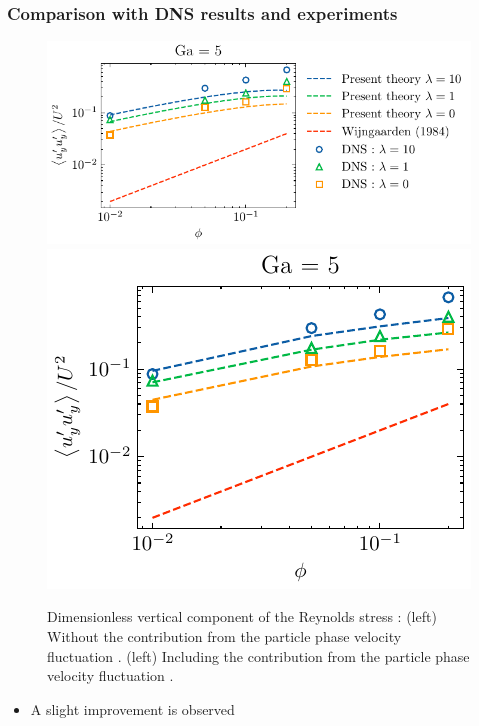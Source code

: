 \documentclass{sintefbeamer}
\begin{document}
\begin{frame}
  \frametitle{Comparison with DNS results and experiments}
  \begin{figure}[h!]
    \centering    
    \includegraphics[height = 0.25\textwidth]{image/HOMOGENEOUS_NEW/CA/UUyy.pdf}
    \includegraphics[height = 0.25\textwidth]{image/HOMOGENEOUS_NEW/CA/UUyykp.pdf}
    \caption{
       Dimensionless vertical component of the Reynolds stress :
       (left) Without the contribution from the particle phase velocity fluctuation . 
       (left) Including the contribution from the particle phase velocity fluctuation . 
    }
    \label{fig:Cp}
\end{figure}  
\begin{itemize}
  \item A slight improvement is observed
\end{itemize}
\end{frame}
\end{document}
